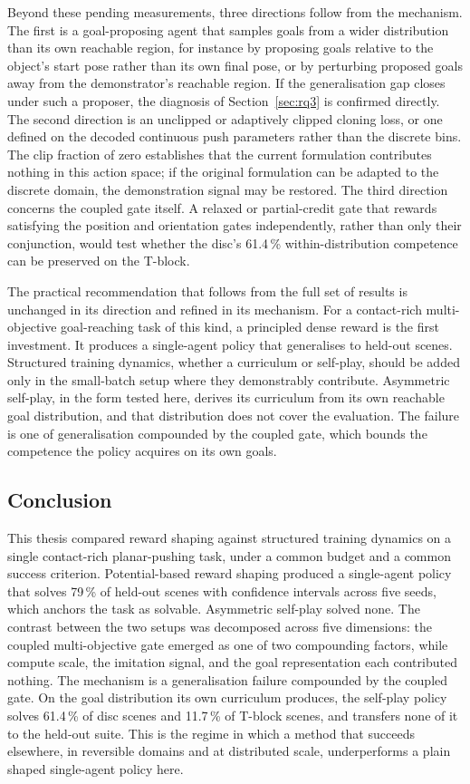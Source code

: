 Beyond these pending measurements, three directions follow from the mechanism.
The first is a goal-proposing agent that samples goals from a wider distribution
than its own reachable region, for instance by proposing goals relative to the
object's start pose rather than its own final pose, or by perturbing proposed
goals away from the demonstrator's reachable region. If the generalisation gap
closes under such a proposer, the diagnosis of Section~\ref{sec:rq3} is
confirmed directly. The second direction is an unclipped or adaptively clipped
cloning loss, or one defined on the decoded continuous push parameters rather
than the discrete bins. The clip fraction of zero establishes that the current
formulation contributes nothing in this action space; if the original
formulation can be adapted to the discrete domain, the demonstration signal may
be restored. The third direction concerns the coupled gate itself. A relaxed or
partial-credit gate that rewards satisfying the position and orientation gates
independently, rather than only their conjunction, would test whether the disc's
61.4\,\% within-distribution competence can be preserved on the T-block.

The practical recommendation that follows from the full set of results is
unchanged in its direction and refined in its mechanism. For a contact-rich
multi-objective goal-reaching task of this kind, a principled dense reward is
the first investment. It produces a single-agent policy that generalises to
held-out scenes. Structured training dynamics, whether a curriculum or
self-play, should be added only in the small-batch setup where they
demonstrably contribute. Asymmetric self-play, in the form tested here, derives
its curriculum from its own reachable goal distribution, and that distribution
does not cover the evaluation. The failure is one of generalisation compounded by
the coupled gate, which bounds the competence the policy acquires on its own
goals.

\subsection{Conclusion}
\label{sec:final}

This thesis compared reward shaping against structured training dynamics on a
single contact-rich planar-pushing task, under a common budget and a common
success criterion. Potential-based reward shaping produced a single-agent policy
that solves 79\,\% of held-out scenes with confidence intervals across five
seeds, which anchors the task as solvable. Asymmetric self-play solved none. The
contrast between the two setups was decomposed across five dimensions: the coupled
multi-objective gate emerged as one of two compounding factors, while compute
scale, the imitation signal, and the goal representation each contributed
nothing. The mechanism is a generalisation failure compounded by the coupled
gate. On the goal distribution its own curriculum produces, the self-play policy
solves 61.4\,\% of disc scenes and 11.7\,\% of T-block scenes, and transfers none
of it to the held-out suite. This is the regime in which a method that succeeds
elsewhere, in
reversible domains and at distributed scale, underperforms a plain shaped
single-agent policy here.
